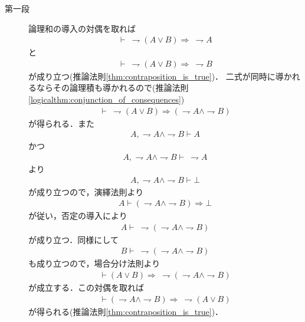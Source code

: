 	\begin{prf}\mbox{}
		\begin{description}
			\item[第一段]	論理和の導入の対偶を取れば
				\begin{align}
					\vdash\ \rightharpoondown (A \vee B) \Longrightarrow\ \rightharpoondown A
				\end{align}
				と
				\begin{align}
					\vdash\ \rightharpoondown (A \vee B) \Longrightarrow\ \rightharpoondown B
				\end{align}
				が成り立つ(推論法則\ref{thm:contraposition_is_true})．
				二式が同時に導かれるならその論理積も導かれるので(推論法則\ref{logicalthm:conjunction_of_consequences})
				\begin{align}
					\vdash\ \rightharpoondown (A \vee B) \Longrightarrow (\rightharpoondown A \wedge \rightharpoondown B)
				\end{align}
				が得られる．また
				\begin{align}
					A, \rightharpoondown A \wedge \rightharpoondown B \vdash A
				\end{align}
				かつ
				\begin{align}
					A, \rightharpoondown A \wedge \rightharpoondown B \vdash\ \rightharpoondown A
				\end{align}
				より
				\begin{align}
					A, \rightharpoondown A \wedge \rightharpoondown B \vdash \bot
				\end{align}
				が成り立つので，演繹法則より
				\begin{align}
					A \vdash (\rightharpoondown A \wedge \rightharpoondown B) \Longrightarrow \bot
				\end{align}
				が従い，否定の導入により
				\begin{align}
					A \vdash\ \rightharpoondown (\rightharpoondown A \wedge \rightharpoondown B)
				\end{align}
				が成り立つ．同様にして
				\begin{align}
					B \vdash\ \rightharpoondown (\rightharpoondown A \wedge \rightharpoondown B)
				\end{align}
				も成り立つので，場合分け法則より
				\begin{align}
					\vdash (A \vee B) \Longrightarrow\ \rightharpoondown (\rightharpoondown A \wedge \rightharpoondown B)
				\end{align}
				が成立する．この対偶を取れば
				\begin{align}
					\vdash (\rightharpoondown A \wedge \rightharpoondown B) \Longrightarrow\ \rightharpoondown (A \vee B)
				\end{align}
				が得られる(推論法則\ref{thm:contraposition_is_true})．
				

\end{description}
\end{prf}
